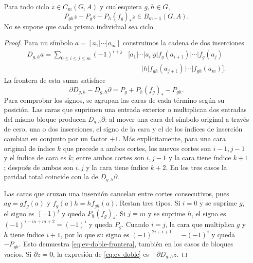 \begin{proposicion}
\label{prop:ev-doble}
Para todo ciclo $z\in C_m(G,A)$ y cualesquiera $g,h\in G$,
\begin{equation}
 P_{gh}z-P_gz-P_h(f_g)_*z\in B_{m+1}(G,A).
 \label{eq:ev-doble}
\end{equation}
No se supone que cada prisma individual sea ciclo.
\end{proposicion}
\begin{proof}
Para un símbolo $a=[a_1|\cdots|a_m]$ construimos la cadena de dos inserciones
\begin{equation}
 \begin{aligned}
 D_{g,h}a=\sum_{0\le i\le j\le m}(-1)^{i+j}
 &[a_1|\cdots|a_i|g|f_g(a_{i+1})|\cdots|f_g(a_j)\\
 &\qquad|h|f_{gh}(a_{j+1})|\cdots|f_{gh}(a_m)].
 \end{aligned}
 \label{eq:ev-doble-forma}
\end{equation}
La frontera de esta suma satisface
\begin{equation}
 \partial D_{g,h}-D_{g,h}\partial=P_g+P_h(f_g)_*-P_{gh}.
 \label{eq:ev-doble-frontera}
\end{equation}
Para comprobar los signos, se agrupan las caras de cada término según su posición. Las caras que suprimen una entrada exterior o multiplican dos entradas del mismo bloque producen $D_{g,h}\partial$: al mover una cara del símbolo original a través de cero, una o dos inserciones, el signo de la cara y el de los índices de inserción cambian en conjunto por un factor $+1$. Más explícitamente, para una cara original de índice $k$ que precede a ambos cortes, los nuevos cortes son $i-1,j-1$ y el índice de cara es $k$; entre ambos cortes son $i,j-1$ y la cara tiene índice $k+1$; después de ambos son $i,j$ y la cara tiene índice $k+2$. En los tres casos la paridad total coincide con la de $D_{g,h}\partial$.

Las caras que cruzan una inserción cancelan entre cortes consecutivos, pues $a g=g f_g(a)$ y $f_g(a)h=h f_{gh}(a)$. Restan tres tipos. Si $i=0$ y se suprime $g$, el signo es $(-1)^j$ y queda $P_h(f_g)_*$. Si $j=m$ y se suprime $h$, el signo es $(-1)^{i+m+m+2}=(-1)^i$ y queda $P_g$. Cuando $i=j$, la cara que multiplica $g$ y $h$ tiene índice $i+1$, por lo que su signo es $(-1)^{2i+i+1}=-(-1)^i$ y queda $-P_{gh}$. Esto demuestra \eqref{eq:ev-doble-frontera}, también en los casos de bloques vacíos. Si $\partial z=0$, la expresión de \eqref{eq:ev-doble} es $-\partial D_{g,h}z$.
\end{proof}

